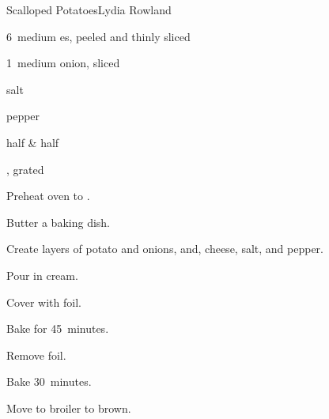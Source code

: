 \begin{recipe}{Scalloped Potatoes}{Lydia Rowland}{}

\begin{ingredients}
\item 6~medium es, peeled and thinly sliced
\item 1~medium onion, sliced
\item {} salt
\item \tp{\quarter} pepper
\item \C{1\half} half \& half 
\item {}, grated
\end{ingredients}

\begin{directions}
\item Preheat oven to .
\item Butter a baking dish.
\item Create layers of potato and onions, and, cheese, salt, and pepper.
\item Pour in cream.
\item Cover with foil.
\item Bake for 45~minutes.
\item Remove foil.
\item Bake 30~minutes.
\item Move to broiler to brown.
\end{directions}

\end{recipe}
